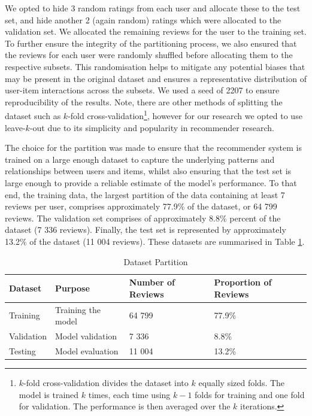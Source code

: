We opted to hide 3 random ratings from each user and allocate these to the test set, and hide another 2 (again random) ratings which were allocated to the validation set. We allocated the remaining reviews for the user to the training set. To further ensure the integrity of the partitioning process, we also ensured that the reviews for each user were randomly shuffled before allocating them to the respective subsets. This randomisation helps to mitigate any potential biases that may be present in the original dataset and ensures a representative distribution of user-item interactions across the subsets. We used a seed of 2207 to ensure reproducibility of the results. Note, there are other methods of splitting the dataset such as $k$-fold cross-validation\footnote{$k$-fold cross-validation divides the dataset into $k$ equally sized folds. The model is trained $k$ times, each time using $k-1$ folds for training and one fold for validation. The performance is then averaged over the $k$ iterations.}, however for our research we opted to use leave-$k$-out due to its simplicity and popularity in recommender research.

The choice for the partition was made to ensure that the recommender system is trained on a large enough dataset to capture the underlying patterns and relationships between users and items, whilst also ensuring that the test set is large enough to provide a reliable estimate of the model's performance. To that end, the training data, the largest partition of the data containing at least 7 reviews per user, comprises approximately 77.9\% of the dataset, or 64 799 reviews. The validation set comprises of approximately 8.8\% percent of the dataset (7 336 reviews). Finally, the test set is represented by approximately 13.2\% of the dataset (11 004 reviews). These datasets are summarised in Table \ref{tab:partition summary}.

\begin{table}[h]
  \centering
  \begin{tabular}{|l|l|l|l|}
  \hline
  \textbf{Dataset} & \textbf{Purpose} & \textbf{Number of Reviews} & \textbf{Proportion of Reviews} \\
  \hline
  Training & Training the model  & 64 799 & 77.9\% \\
  \hline
  Validation & Model validation  & 7 336 & 8.8\% \\
  \hline
  Testing & Model evaluation  & 11 004 & 13.2\% \\
  \hline
  \end{tabular}
  \caption{Dataset Partition}
  \label{tab:partition summary}
  \end{table}


